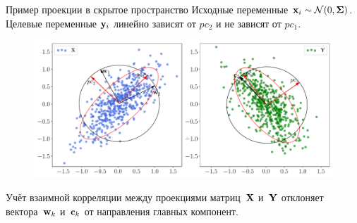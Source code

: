 \documentclass[10pt]{beamer}
\begin{document}
\begin{frame}{Пример проекции в скрытое пространство}
	Исходные переменные $\mathbf{x}_i \sim \mathcal{N}(0, \mathbf{\Sigma})$. \\ 
	Целевые переменные $\mathbf{y}_i$ линейно зависят от $pc_2$ и не зависят от $pc_1$.
	\begin{figure}[h]
	\centering
	\includegraphics[width=\linewidth]{figs/pls_toy_example}
	\end{figure}
	Учёт взаимной корреляции между проекциями матриц~$\mathbf{X}$ и~$\mathbf{Y}$ отклоняет вектора~$\mathbf{w}_k$ и~$\mathbf{c}_k$ от направления главных компонент. 
\end{frame}
\end{document}
